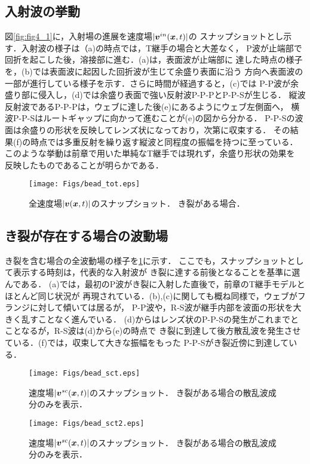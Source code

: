 \subsection{入射波の挙動}
図\ref{fig:fig4_1}に，入射場の進展を速度場$|\mbox{\boldmath $v$}^{in}(\mbox{\boldmath $x$},t)|$の
スナップショットとし示す．入射波の様子は（a)の時点では，T継手の場合と大差なく，
P波が止端部で回折を起こした後，溶接部に進む．(a)は，表面波が止端部に
達した時点の様子を，(b)では表面波に起因した回折波が生じて余盛り表面に沿う
方向へ表面波の一部が進行している様子を示す．さらに時間が経過すると，(c)では
P-P波が余盛り部に侵入し，(d)では余盛り表面で強い反射波P-P-PとP-P-Sが生じる．
縦波反射波であるP-P-Pは，ウェブに達した後(e)にあるようにウェブ左側面へ，
横波P-P-Sはルートギャップに向かって進むことが(e)の図から分かる．
P-P-Sの波面は余盛りの形状を反映してレンズ状になっており，次第に収束する．
その結果(f)の時点では多重反射を繰り返す縦波と同程度の振幅を持つに至っている．
このような挙動は前章で用いた単純なT継手では現れず，余盛り形状の効果を
反映したものであることが明らかである．
\begin{figure}[h]
	\begin{center}
	\texttt{[image: Figs/bead\_tot.eps]} 
	\end{center}
	\caption{
		全速度場$|\mbox{\boldmath $v$}(\mbox{\boldmath $x$},t)|$のスナップショット．
		き裂がある場合．
	} 
	\label{fig:fig4_2}
\end{figure}
\subsection{き裂が存在する場合の波動場}
き裂を含む場合の全波動場の様子を\ref{fig:fig4_2}に示す．
ここでも，スナップショットとして表示する時刻は，代表的な入射波が
き裂に達する前後となることを基準に選んである．
(a)では，最初のP波がき裂に入射した直後で，前章のT継手モデルとほとんど同じ状況が
再現されている．(b),(c)に関しても概ね同様で，ウェブがフランジに対して傾いては居るが，
P-P波や，R-S波が継手内部を波面の形状を大きく乱すことなく進んでいる．
(d)からはレンズ状のP-P-Sの発生がこれまでとことなるが，R-S波は(d)から(e)の時点で
き裂に到達して後方散乱波を発生させている．(f)では，収束して大きな振幅をもった
P-P-Sがき裂近傍に到達している．
\begin{figure}[h]
	\begin{center}
	\texttt{[image: Figs/bead\_sct.eps]} 
	\end{center}
	\caption{
		速度場$|\mbox{\boldmath $v$}^{sc}(\mbox{\boldmath $x$},t)|$のスナップショット．
		き裂がある場合の散乱波成分のみを表示．
	} 
	\label{fig:fig4_3}
\end{figure}
\begin{figure}[h]
	\begin{center}
	\texttt{[image: Figs/bead\_sct2.eps]} 
	\end{center}
	\caption{
		速度場$|\mbox{\boldmath $v$}^{sc}(\mbox{\boldmath $x$},t)|$のスナップショット．
		き裂がある場合の散乱波成分のみを表示．
	} 
	\label{fig:fig4_4}
\end{figure}

